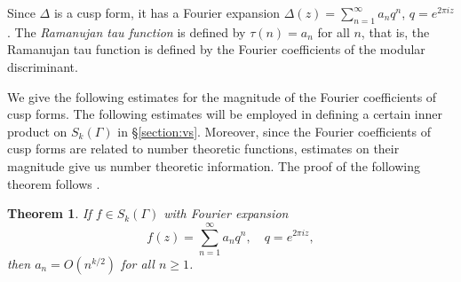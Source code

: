 \documentclass{article}
\newtheorem{theorem}{Theorem}
\begin{document}
Since $\Delta$ is a cusp form, it has a Fourier expansion $\Delta(z)=\sum_{n=1}^\infty a_n q^n$, $q=e^{2\pi iz}$. The {\em Ramanujan tau function} is defined by $\tau(n)=a_n$ for all $n$, that is, the Ramanujan tau function is defined by the 
Fourier coefficients of the modular discriminant.


We give the following estimates for the magnitude of the Fourier coefficients of cusp forms. The following estimates
will be employed in defining a certain inner product on $S_k(\Gamma)$ in \S \ref{section:vs}.
Moreover, since
the Fourier coefficients of cusp forms are related to number theoretic functions, estimates on their magnitude 
give us number theoretic information.
The proof of the following theorem follows \cite[Chapter VII, Theorem 5]{MR0344216}. 

\begin{theorem}
If $f \in S_k(\Gamma)$ with Fourier expansion
\[
f(z)=\sum_{n=1}^\infty a_n q^n, \quad q=e^{2\pi iz},
\]
then $a_n=O(n^{k/2})$ for all $n \geq 1$.
\end{theorem}
\end{document}

